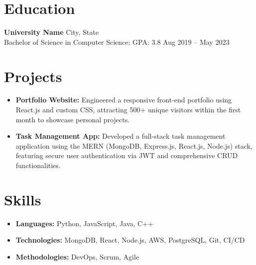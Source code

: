 \documentclass[letterpaper,11pt]{article}
\begin{document}
\section*{Education}
\textbf{University Name} \hfill City, State \\
Bachelor of Science in Computer Science; GPA: 3.8 \hfill Aug 2019 – May 2023
\vspace{-5pt} %

\section*{Projects}
\begin{itemize}
    \item \textbf{Portfolio Website:} Engineered a responsive front-end portfolio using React.js and custom CSS, attracting 500+ unique visitors within the first month to showcase personal projects.
    \item \textbf{Task Management App:} Developed a full-stack task management application using the MERN (MongoDB, Express.js, React.js, Node.js) stack, featuring secure user authentication via JWT and comprehensive CRUD functionalities.
\end{itemize}
\vspace{-5pt} %

\section*{Skills}
\begin{itemize}
    \item \textbf{Languages:} Python, JavaScript, Java, C++
    \item \textbf{Technologies:} MongoDB, React, Node.js, AWS, PostgreSQL, Git, CI/CD
    \item \textbf{Methodologies:} DevOps, Scrum, Agile
\end{itemize}
\end{document}
